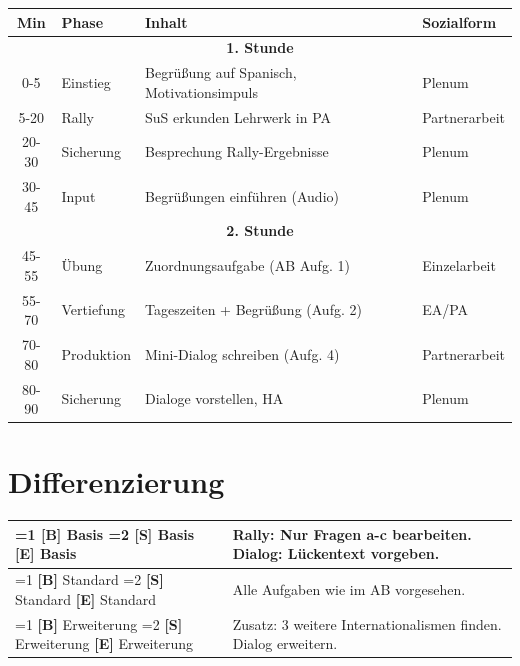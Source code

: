 \documentclass[11pt,a4paper]{article}
\newcommand{\niveau}[2]{%
    \ifnum#1=1 \textcolor{basis}{\textbf{[B]}} #2%
    \else\ifnum#1=2 \textcolor{standard}{\textbf{[S]}} #2%
    \else \textcolor{erweiterung}{\textbf{[E]}} #2%
    \fi\fi%
}
\begin{document}
\renewcommand{\arraystretch}{1.3}
\begin{tabularx}{\textwidth}{|c|l|X|l|}
\hline
\rowcolor{spanisch!20}
\textbf{Min} & \textbf{Phase} & \textbf{Inhalt} & \textbf{Sozialform} \\
\hline
\multicolumn{4}{|c|}{\cellcolor{spanisch!10}\textbf{1. Stunde}} \\
\hline
0-5 & Einstieg & Begrüßung auf Spanisch, Motivationsimpuls & Plenum \\
\hline
5-20 & Rally & SuS erkunden Lehrwerk in PA & Partnerarbeit \\
\hline
20-30 & Sicherung & Besprechung Rally-Ergebnisse & Plenum \\
\hline
30-45 & Input & Begrüßungen einführen (Audio) & Plenum \\
\hline
\multicolumn{4}{|c|}{\cellcolor{spanisch!10}\textbf{2. Stunde}} \\
\hline
45-55 & Übung & Zuordnungsaufgabe (AB Aufg. 1) & Einzelarbeit \\
\hline
55-70 & Vertiefung & Tageszeiten + Begrüßung (Aufg. 2) & EA/PA \\
\hline
70-80 & Produktion & Mini-Dialog schreiben (Aufg. 4) & Partnerarbeit \\
\hline
80-90 & Sicherung & Dialoge vorstellen, HA & Plenum \\
\hline
\end{tabularx}

\vspace{1.5em}

\section*{Differenzierung}

\begin{tabularx}{\textwidth}{|l|X|}
\hline
\rowcolor{basis!20}
\niveau{1}{Basis} & Rally: Nur Fragen a-c bearbeiten. Dialog: Lückentext vorgeben. \\
\hline
\rowcolor{standard!20}
\niveau{2}{Standard} & Alle Aufgaben wie im AB vorgesehen. \\
\hline
\rowcolor{erweiterung!20}
\niveau{3}{Erweiterung} & Zusatz: 3 weitere Internationalismen finden. Dialog erweitern. \\
\hline
\end{tabularx}
\end{document}
